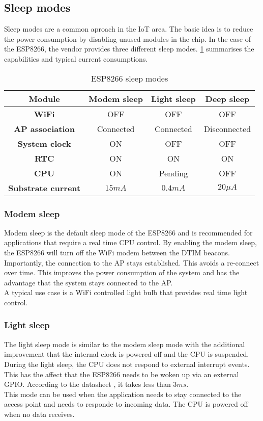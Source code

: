 \subsection{Sleep modes}
Sleep modes are a common aproach in the IoT area. 
The basic idea is to reduce the power consumption by disabling unused modules in the chip.
In the case of the ESP8266, the vendor provides three different sleep modes. 
\ref{tab_sleep_modes} summarises the capabilities and typical current consumptions.
\cite{mesquita_assessing_2018}

\begin{table}[htbp]
\caption{ESP8266 sleep modes}
\begin{center}
\begin{tabular}{|c|c|c|c|}
\hline
\textbf{Module}&\textbf{Modem sleep}&\textbf{Light sleep}&\textbf{Deep sleep}\\
\hline
\textbf{WiFi} & OFF & OFF & OFF\\
\textbf{AP association} & Connected & Connected & Disconnected\\
\textbf{System clock} & ON & OFF & OFF\\
\textbf{RTC} & ON & ON & ON\\
\textbf{CPU} & ON & Pending & OFF\\
\hline
\textbf{Substrate current} & $15mA$ & $0.4mA$ & $20\mu A$\\
\hline
\end{tabular}
\label{tab_sleep_modes}
\end{center}
\end{table}

\subsubsection{Modem sleep}
Modem sleep is the default sleep mode of the ESP8266 and is recommended for applications that require a real time CPU control. \cite{mesquita_assessing_2018}
By enabling the modem sleep, the ESP8266 will turn off the WiFi modem between the DTIM beacons. 
Importantly, the connection to the AP stays established. This avoids a re-connect over time.
This improves the power consumption of the system and has the advantage that the system stays connected to the AP. \cite{espressif_inc_esp8266_2016}\\
A typical use case is a WiFi controlled light bulb that provides real time light control.

\subsubsection{Light sleep}
The light sleep mode is similar to the modem sleep mode with the additional improvement that the internal clock is powered off and the CPU is suspended.\\
During the light sleep, the CPU does not respond to external interrupt events. 
This has the affect that the ESP8266 needs to be woken up via an external GPIO.
According to the datasheet \cite{espressif_inc_esp8266_2016}, it takes less than $3ms$.\\
This mode can be used when the application needs to stay connected to the access point 
and needs to responde to incoming data. The CPU is powered off when no data receives.

